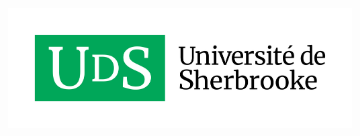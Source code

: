 \begin{titlepage}
\begin{center}
\begin{figure}[h]
\begin{subfigure}[b]{0.3\textwidth}
             \end{subfigure}
             \hfill
             \begin{subfigure}[b]{0.3\textwidth}
                 \centering
                 \includegraphics[width=\textwidth]{images/UdeS_logo_rgbHR.png}
             \end{subfigure}
        \end{figure}
    \end{center}
\end{titlepage}
